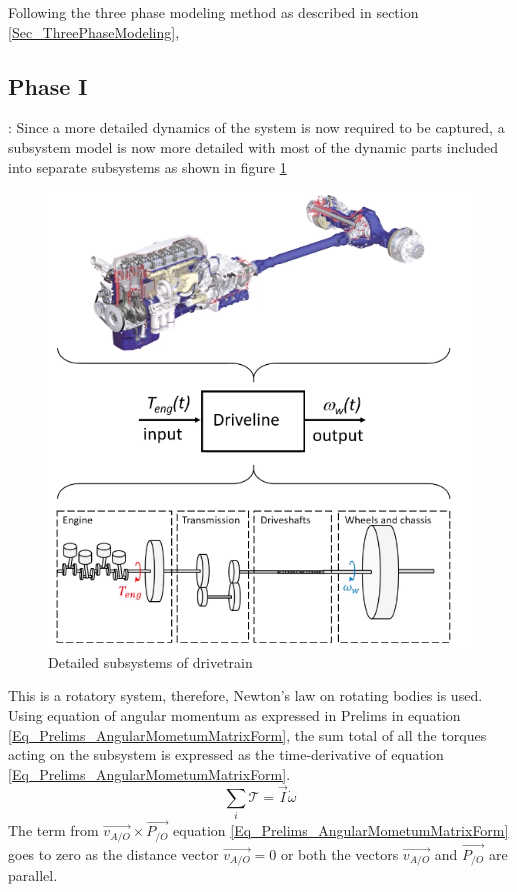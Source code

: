Following the three phase modeling method as described in section \ref{Sec_ThreePhaseModeling},

\subsection{Phase I}: Since a more detailed dynamics of the system is now required to be captured, a subsystem model is now more detailed with most of the dynamic parts included into separate subsystems as shown in figure \ref{Fig_ModelingAutoSys_Drivetrain_1}
\begin{figure}[h!]
	\centering
	\includegraphics[width=0.6\linewidth]{Bilder/ModelingAutoSys_Drivetrain_1}
	\caption{Detailed subsystems of drivetrain}
	\label{Fig_ModelingAutoSys_Drivetrain_1}
\end{figure}
This is a rotatory system, therefore, Newton's law on rotating bodies is used. Using equation of angular momentum as expressed in Prelims in equation \eqref{Eq_Prelims_AngularMometumMatrixForm}, the sum total of all the torques acting on the subsystem is expressed as the time-derivative of equation \eqref{Eq_Prelims_AngularMometumMatrixForm}.
\begin{equation}
	\sum_{i}^{} \mathcal{T} = \vec{I} \dot{\omega}
\end{equation}
The term from $\vec{v_{A/O}} \times \vec{P_{/O}}$ equation \eqref{Eq_Prelims_AngularMometumMatrixForm} goes to zero as the distance vector $\vec{v_{A/O}} = 0$ or both the vectors $\vec{v_{A/O}}$ and $\vec{P_{/O}}$ are parallel.

